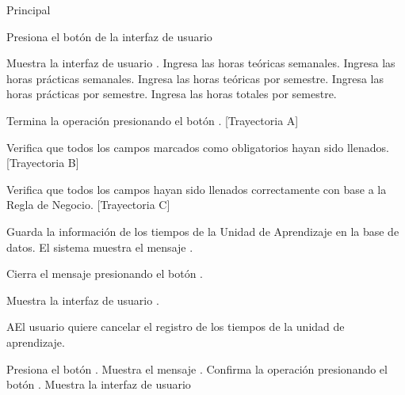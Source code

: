 \begin{UCtrayectoria}{Principal}

\UCpaso[\UCactor] Presiona el botón  de la interfaz de usuario 

\UCpaso Muestra la interfaz de usuario .
\UCpaso[\UCactor] Ingresa las horas teóricas semanales.
\UCpaso[\UCactor] Ingresa las horas prácticas semanales. 
\UCpaso[\UCactor] Ingresa las horas teóricas por semestre.
\UCpaso[\UCactor] Ingresa las horas prácticas por semestre.
\UCpaso[\UCactor] Ingresa las horas totales por semestre.

\UCpaso[\UCactor] Termina la operación presionando el botón . [Trayectoria A] 

\UCpaso Verifica que todos los campos marcados como obligatorios hayan sido llenados. [Trayectoria B]

\UCpaso Verifica que todos los campos hayan sido llenados correctamente con base a la Regla de Negocio. [Trayectoria C] %


\UCpaso Guarda la información de los tiempos de la Unidad de Aprendizaje en la base de datos.
\UCpaso El sistema muestra el mensaje .

\UCpaso[\UCactor] Cierra el mensaje presionando el botón .

\UCpaso Muestra la interfaz de usuario .
\end{UCtrayectoria}


\begin{UCtrayectoriaA}{A}{El usuario quiere cancelar el registro de los tiempos de la unidad de aprendizaje.}

\UCpaso[\UCactor] Presiona el botón .
\UCpaso Muestra el mensaje .
\UCpaso[\UCactor] Confirma la operación presionando el botón .
\UCpaso Muestra la interfaz de usuario 

\end{UCtrayectoriaA}



